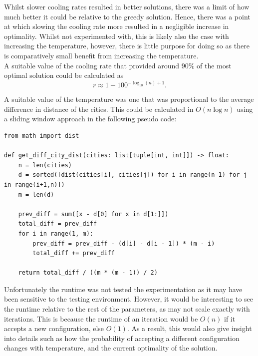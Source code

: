 \documentclass{article}
\begin{document}
Whilst slower cooling rates resulted in better solutions, there was a limit of how much better it could be relative to the greedy solution.
Hence, there was a point at which slowing the cooling rate more resulted in a negligible increase in optimality.
Whilst not experimented with, this is likely also the case with increasing the temperature, however, there is little purpose for doing so as there is comparatively small benefit from increasing the temperature.
\\

A suitable value of the cooling rate that provided around $90\%$ of the most optimal solution could be calculated as 
$$r \approx 1 - 100^{-\log_{10}(n) + 1}.$$

A suitable value of the temperature was one that was proportional to the average difference in distance of the cities.
This could be calculated in $O(n\log n)$ using a sliding window approach in the following pseudo code:

\begin{verbatim}
from math import dist

def get_diff_city_dist(cities: list[tuple[int, int]]) -> float:
    n = len(cities)
    d = sorted([dist(cities[i], cities[j]) for i in range(n-1) for j in range(i+1,n)])
    m = len(d)
    
    prev_diff = sum([x - d[0] for x in d[1:]])
    total_diff = prev_diff
    for i in range(1, m):
        prev_diff = prev_diff - (d[i] - d[i - 1]) * (m - i)
        total_diff += prev_diff
    
    return total_diff / ((m * (m - 1)) / 2)
\end{verbatim}

Unfortunately the runtime was not tested the experimentation as it may have been sensitive to the testing environment.
However, it would be interesting to see the runtime relative to the rest of the parameters, as may not scale exactly with iterations.
This is because the runtime of an iteration would be $O(n)$ if it accepts a new configuration, else $O(1)$.
As a result, this would also give insight into details such as how the probability of accepting a different configuration changes with temperature, and the current optimality of the solution.


\newpage
\end{document}

